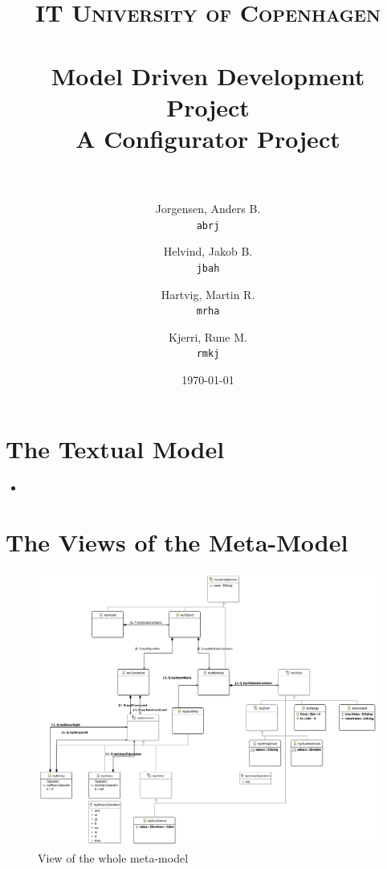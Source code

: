 \documentclass[paper=a4, fontsize=11pt]{scrartcl} %
\title{	
\normalfont \normalsize 
\textsc{IT University of Copenhagen} \\ [25pt] %
\horrule{0.5pt} \\[0.4cm] %
\huge Model Driven Development Project \\ %
\large A Configurator Project \\ %
\horrule{2pt} \\[0.5cm] %
}
\author{
  Jorgensen, Anders B.\\
  \texttt{abrj}
  \and
  Helvind, Jakob B.\\
  \texttt{jbah}
  \and
  Hartvig, Martin R.\\
  \texttt{mrha}
  \and
  Kjerri, Rune M.\\
  \texttt{rmkj}
}
\date{\normalsize\today} %
\numberwithin{equation}{section} %
\numberwithin{figure}{section} %
\numberwithin{table}{section} %
\newcommand{\java}[2]{
\begin{itemize}
\item[]
\end{itemize}
}
\begin{document}
\maketitle %
\newpage


\section{The Textual Model}
\java{../configproject/runtime-CarFactory/src/factory.smdpdsl}{Concrete syntax of a CarFactory}

\section{The Views of the Meta-Model}
\begin{figure}[H]
\centering
\includegraphics[scale=0.65]{pictures/metamodel.png}
\caption{View of the whole meta-model}
\end{figure}
\end{document}
